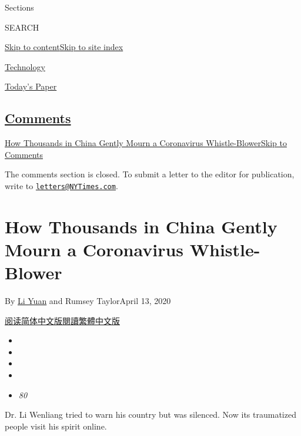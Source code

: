 Sections

SEARCH

\protect\hyperlink{site-content}{Skip to
content}\protect\hyperlink{site-index}{Skip to site index}

\href{https://www.nytimes3xbfgragh.onion/section/technology}{Technology}

\href{https://myaccount.nytimes3xbfgragh.onion/auth/login?response_type=cookie\&client_id=vi}{}

\href{https://www.nytimes3xbfgragh.onion/section/todayspaper}{Today's
Paper}

\hypertarget{comments}{%
\subsection{\texorpdfstring{\protect\hyperlink{commentsContainer}{Comments}}{Comments}}\label{comments}}

\href{}{How Thousands in China Gently Mourn a Coronavirus
Whistle-Blower}\href{}{Skip to Comments}

The comments section is closed. To submit a letter to the editor for
publication, write to
\href{mailto:letters@NYTimes.com}{\nolinkurl{letters@NYTimes.com}}.

\hypertarget{how-thousands-in-china-gently-mourn-a-coronavirus-whistle-blower}{%
\section{How Thousands in China Gently Mourn a Coronavirus
Whistle-Blower}\label{how-thousands-in-china-gently-mourn-a-coronavirus-whistle-blower}}

By \href{https://www.nytimes3xbfgragh.onion/by/li-yuan}{Li Yuan} and
Rumsey TaylorApril 13, 2020

\href{https://cn.nytimes3xbfgragh.onion/china/20200414/coronavirus-doctor-whistleblower-weibo/}{阅读简体中文版}\href{https://cn.nytimes3xbfgragh.onion/china/20200414/coronavirus-doctor-whistleblower-weibo/zh-hant/}{閱讀繁體中文版}

\begin{itemize}
\item
\item
\item
\item
\item
  \emph{80}
\end{itemize}

Dr. Li Wenliang tried to warn his country but was silenced. Now its
traumatized people visit his spirit online.

